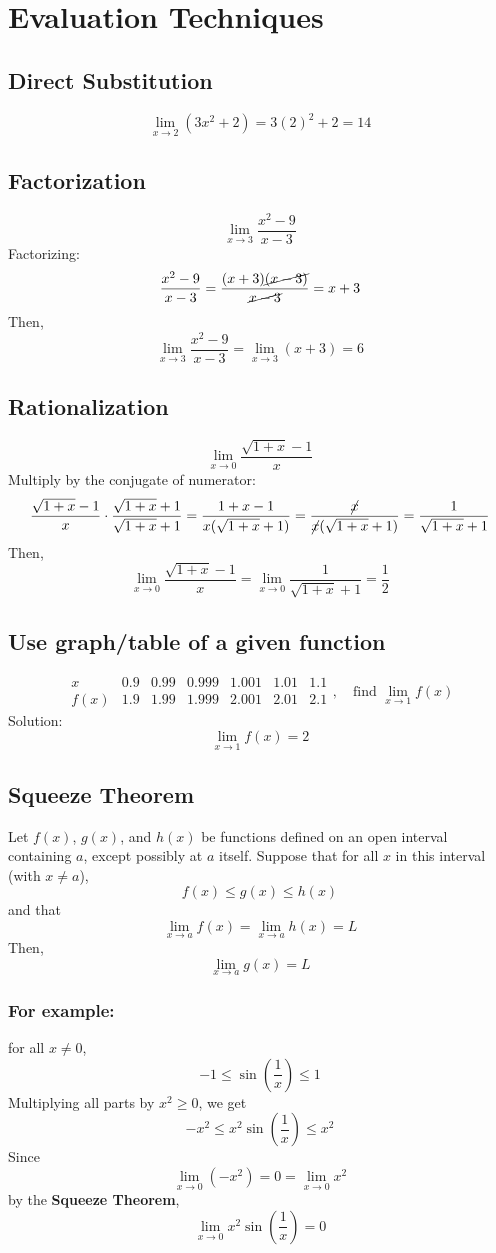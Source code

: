 \documentclass[11pt]{article}
\begin{document}
\section{Evaluation Techniques}
\subsection{Direct Substitution}
\[
    \lim_{x\to 2}(3x^2+2)=3(2)^2+2=14
\]
\subsection{Factorization}
\[
    \lim_{x\to 3}\frac{x^2-9}{x-3}
\]
Factorizing:
\[
    \frac{x^2-9}{x-3}=\frac{(x+3)\cancel{(x-3)}}{\cancel{x-3}}=x+3
\]
Then,
\[
    \lim_{x\to 3}\frac{x^2-9}{x-3}=\lim_{x\to 3}(x+3)=6
\]
\subsection{Rationalization}
\[
    \lim_{x\to 0}\frac{\sqrt{1+x}-1}{x}
\]
Multiply by the conjugate of numerator:
\[
    \frac{\sqrt{1+x}-1}{x}\cdot\frac{\sqrt{1+x}+1}{\sqrt{1+x}+1}=
    \frac{1+x-1}{x(\sqrt{1+x}+1)}=\frac{\cancel{x}}{\cancel{x}(\sqrt{1+x}+1)}=
    \frac{1}{\sqrt{1+x}+1}
\]
Then,
\[
    \lim_{x\to 0}\frac{\sqrt{1+x}-1}{x}=\lim_{x\to 0}\frac{1}{\sqrt{1+x}+1}=\frac{1}{2}
\]
\subsection{Use graph/table of a given function}
\[
    \begin{array}{c|cccccc}
        x & 0.9 & 0.99 & 0.999 & 1.001 & 1.01 & 1.1 \\
        \hline
        f(x) & 1.9 & 1.99 & 1.999 & 2.001 & 2.01 & 2.1
    \end{array},
    \quad\text{find $\lim_{x\to 1}f(x)$}
\]
Solution:
\[
    \lim_{x\to 1}f(x)=2
\]
\subsection{Squeeze Theorem}
Let $f(x)$, $g(x)$, and $h(x)$ be functions defined on an open interval containing $a$, 
except possibly at $a$ itself. Suppose that for all $x$ in this interval (with $x \ne a$),
\[
    f(x) \le g(x) \le h(x)
\]
and that\[
    \lim_{x \to a} f(x) = \lim_{x \to a} h(x) = L
\] 
Then,\[
    \lim_{x \to a} g(x) = L
\]
\subsubsection*{For example:}
for all $x \ne 0$,
\[
    -1 \le \sin\left(\frac{1}{x}\right) \le 1
\]
Multiplying all parts by $x^2 \ge 0$, we get
\[
    -x^2 \le x^2 \sin\left(\frac{1}{x}\right) \le x^2
\]
Since
\[
    \lim_{x \to 0} (-x^2) = 0 = \lim_{x \to 0} x^2
\]
by the \textbf{Squeeze Theorem},
\[
    \lim_{x \to 0} x^2 \sin\left(\frac{1}{x}\right) = 0
\]
\end{document}
